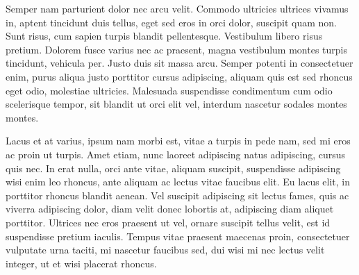 \documentclass[oneside,11pt]{memoir} %
\begin{document}
Semper nam parturient dolor nec arcu velit. Commodo ultricies ultrices vivamus in, aptent tincidunt duis tellus, eget sed eros in orci dolor, suscipit quam non. Sunt risus, cum sapien turpis blandit pellentesque. Vestibulum libero risus pretium. Dolorem fusce varius nec ac praesent, magna vestibulum montes turpis tincidunt, vehicula per. Justo duis sit massa arcu. Semper potenti in consectetuer enim, purus aliqua justo porttitor cursus adipiscing, aliquam quis est sed rhoncus eget odio, molestiae ultricies. Malesuada suspendisse condimentum cum odio scelerisque tempor, sit blandit ut orci elit vel, interdum nascetur sodales montes montes.

Lacus et at varius, ipsum nam morbi est, vitae a turpis in pede nam, sed mi eros ac proin ut turpis. Amet etiam, nunc laoreet adipiscing natus adipiscing, cursus quis nec. In erat nulla, orci ante vitae, aliquam suscipit, suspendisse adipiscing wisi enim leo rhoncus, ante aliquam ac lectus vitae faucibus elit. Eu lacus elit, in porttitor rhoncus blandit aenean. Vel suscipit adipiscing sit lectus fames, quis ac viverra adipiscing dolor, diam velit donec lobortis at, adipiscing diam aliquet porttitor. Ultrices nec eros praesent ut vel, ornare suscipit tellus velit, est id suspendisse pretium iaculis. Tempus vitae praesent maecenas proin, consectetuer vulputate urna taciti, mi nascetur faucibus sed, dui wisi mi nec lectus velit integer, ut et wisi placerat rhoncus.
\end{document}
